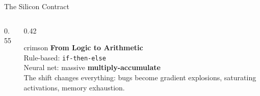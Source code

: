 \documentclass[aspectratio=169, 12pt]{beamer}
\begin{document}
\begin{frame}{The Silicon Contract}
\begin{columns}[T]
\begin{column}{0.55\textwidth}
    \vspace{0.1cm}
  \end{column}
  \begin{column}{0.42\textwidth}
    \begin{mlsyscard}{crimson}
    \textbf{From Logic to Arithmetic}\\[0.1cm]
    {\footnotesize Rule-based: \texttt{if-then-else}\\
    Neural net: massive \textbf{multiply-accumulate}\\[0.1cm]
    The shift changes everything: bugs become gradient explosions, saturating activations, memory exhaustion.}
    \end{mlsyscard}
  \end{column}
\end{columns}

\end{frame}
\end{document}
